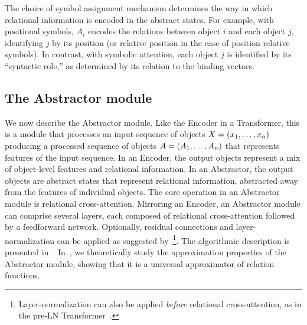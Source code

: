 The choice of symbol assignment mechanism determines the way in which relational information is encoded in the abstract states. For example, with positional symbols, $A_i$ encodes the relations between object $i$ and each object $j$, identifying $j$ by its position (or relative position in the case of position-relative symbols). In contrast, with symbolic attention, each object $j$ is identified by its ``syntactic role,'' as determined by its relation to the binding vectors.

\subsection{The Abstractor module}\label{ssec:abstractor_module}

We now describe the Abstractor module. Like the Encoder in a Transformer, this is a module that processes an input sequence of objects $X = \left(x_1, \ldots, x_n\right)$ producing a processed sequence of objects $A = \left(A_1, \ldots, A_n\right)$ that represents features of the input sequence. In an Encoder, the output objects represent a mix of object-level features and relational information. In an Abstractor, the output objects are abstract states that represent relational information, abstracted away from the features of individual objects. The core operation in an Abstractor module is relational cross-attention. Mirroring an Encoder, an Abstractor module can comprise several layers, each composed of relational cross-attention followed by a feedforward network. Optionally, residual connections and layer-normalization can be applied as suggested by~\citet{vaswani2017attention}\footnote{Layer-normalization can also be applied \textit{before} relational cross-attention, as in the pre-LN Transformer~\citep{xiong2020layer}.}. The algorithmic description is presented in~. In~, we theoretically study the approximation properties of the Abstractor module, showing that it is a universal approximator of relation functions.

